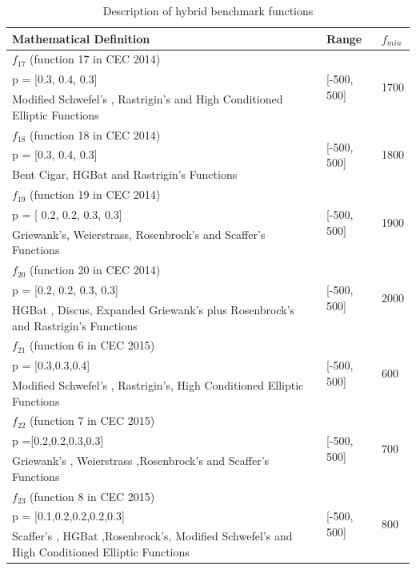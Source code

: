 \documentclass[a4paper,13pt,2p]{report}
\begin{document}
\begin{table}[!t]
\caption{Description of hybrid benchmark functions}
\label{tbl_hybrid_funcs}
\centering
\begin{tabular}{p{9cm} p{2cm} p{1cm}}
 \hline Mathematical Definition & Range & $f_{min}$  \\ 
 \hline
$f_{17}$ (function 17 in CEC 2014) & \multirow{3}{*}{[-500, 500]} & \multirow{3}{*}{1700} \\
p = [0.3, 0.4, 0.3] & \\
Modified Schwefel's , Rastrigin's  and High Conditioned Elliptic Functions & \\ \hline
$f_{18}$ (function 18 in CEC 2014) & \multirow{3}{2cm}{[-500, 500]} & \multirow{3}{1cm}{1800} \\
p = [0.3, 0.4, 0.3] & \\
Bent Cigar, HGBat and Rastrigin’s Functions & \\ \hline
$f_{19}$ (function 19 in CEC 2014) & \multirow{3}{2cm}{[-500, 500]} & \multirow{3}{1cm}{1900} \\
p = [ 0.2, 0.2, 0.3, 0.3] & \\
Griewank’s, Weierstrass, Rosenbrock’s and Scaffer’s Functions & \\ \hline
$f_{20}$ (function 20 in CEC 2014) & \multirow{3}{2cm}{[-500, 500]} & \multirow{3}{1cm}{2000} \\
p =  [0.2, 0.2, 0.3, 0.3] & \\
HGBat , Discus, Expanded Griewank’s plus Rosenbrock’s  and Rastrigin’s Functions & \\ \hline
$f_{21}$ (function 6 in CEC 2015) & \multirow{3}{2cm}{[-500, 500]} & \multirow{3}{1cm}{600} \\
p =  [0.3,0.3,0.4]  & \\
Modified Schwefel's , Rastrigin's, High Conditioned Elliptic Functions & \\ \hline
$f_{22}$ (function 7 in CEC 2015) & \multirow{3}{2cm}{[-500, 500]} & \multirow{3}{1cm}{700} \\
p =[0.2,0.2,0.3,0.3]  & \\
Griewank's , Weierstrass ,Rosenbrock's and Scaffer's Functions & \\ \hline
$f_{23}$ (function 8 in CEC 2015) & \multirow{3}{2cm}{[-500, 500]} & \multirow{3}{1cm}{800} \\
p = [0.1,0.2,0.2,0.2,0.3]  & \\
Scaffer’s , HGBat ,Rosenbrock’s, Modified Schwefel’s and High Conditioned Elliptic Functions & \\ \hline
\end{tabular}
\end{table}
\end{document}
